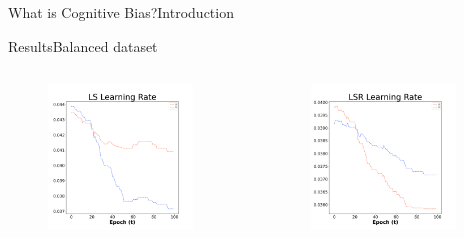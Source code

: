 \documentclass[
	aspectratio=169,	%
	onlytextwidth,		%
	t,					%
	]{beamer}
\begin{document}
\begin{frame}[fragile]{What is Cognitive Bias?}{Introduction}
\begin{frame}[fragile]{Results}{Balanced dataset}
\begin{columns}
			\begin{column}[T]{0.33\textwidth}
				\begin{figure}
					\includegraphics[width=0.9\textwidth]{myfigs/LS_b.png}
				\end{figure}
			\end{column}
		
			\begin{column}[T]{0.33\textwidth}
				\begin{figure}
					\includegraphics[width=0.9\textwidth]{myfigs/LSR_b.png}
				\end{figure}
			\end{column}
		

\end{columns}
\end{frame}
\end{frame}
\end{document}
